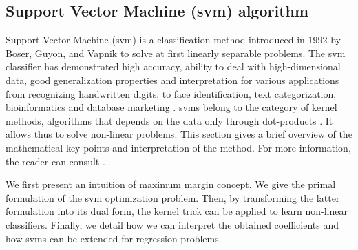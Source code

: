 \subsection{Support Vector Machine ({\sc svm}) algorithm}

Support Vector Machine ({\sc svm}) is a classification method introduced in 1992 by Boser, Guyon, and Vapnik \cite{Boser1992,Cortes1995} to solve at first linearly separable problems. The {\sc svm} classifier has demonstrated high accuracy, ability to deal with high-dimensional data, good generalization properties and interpretation for various applications from recognizing handwritten digits, to face identification, text categorization, bioinformatics and database marketing \cite{Wang2002,Yang1999,Heisele2001,Sadri2003,Campbell2011}. {\sc svm}s belong to the category of kernel methods, algorithms that depends on the data only through dot-products \cite{Schlkopf2013}. It allows thus to solve non-linear problems. This section gives a brief overview of the mathematical key points and interpretation of the method. For more information, the reader can consult \cite{Schlkopf2013,Campbell2011,Cortes1995}.

We first present an intuition of maximum margin concept. We give the primal formulation of the {\sc svm} optimization problem. Then, by transforming the latter formulation into its dual form, the kernel trick can be applied to learn non-linear classifiers. Finally, we detail how we can interpret the obtained coefficients and how {\sc svm}s can be extended for regression problems.



